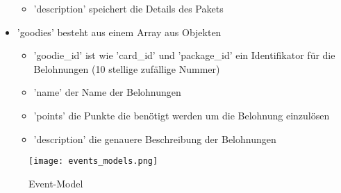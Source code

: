 \begin{itemize}
\begin{itemize}
						\item 'description' speichert die Details des Pakets
					\end{itemize}
					\item 'goodies' besteht aus einem Array aus Objekten
					\begin{itemize}
						\item 'goodie\_id' ist wie 'card\_id' und 'package\_id' ein Identifikator für die Belohnungen (10 stellige zufällige Nummer)
						\item 'name' der Name der Belohnungen
						\item 'points' die Punkte die benötigt werden um die Belohnung einzulösen
						\item 'description' die genauere Beschreibung der Belohnungen
					\end{itemize}				
				\end{itemize}
			
			\begin{figure}[h]
				\centering
				\texttt{[image: events\_models.png]}
				\caption{Event-Model}
			\end{figure}	
			
			\newpage		
				
